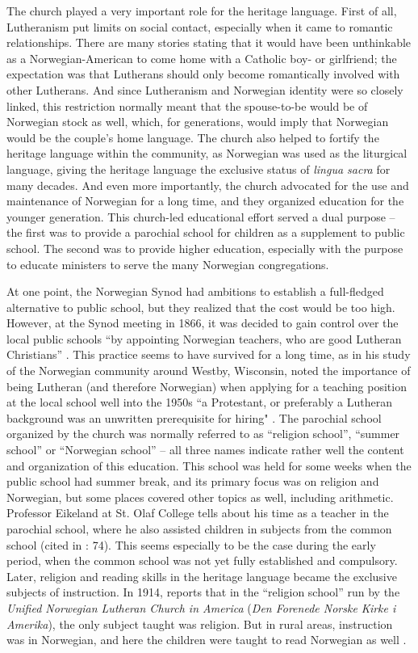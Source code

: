 \documentclass[output=paper]{langscibook}
\begin{document}
The church played a very important role for the heritage language. First of all, Lutheranism put limits on social contact, especially when it came to romantic relationships. There are many stories stating that it would have been unthinkable as a Norwegian\hyp American to come home with a Catholic boy- or girlfriend; the expectation was that Lutherans should only become romantically involved with other Lutherans. And since Lutheranism and Norwegian identity were so closely linked, this restriction normally meant that the spouse-to-be would be of Norwegian stock as well, which, for generations, would imply that Norwegian would be the couple’s home language. The church also helped to fortify the heritage language within the community, as Norwegian was used as the liturgical language, giving the heritage language the exclusive status of \textit{lingua sacra} for many decades. And even more importantly, the church advocated for the use and maintenance of Norwegian for a long time, and they organized education for the younger generation. This church-led educational effort served a dual purpose – the first was to provide a parochial school for children as a supplement to public school. The second was to provide higher education, especially with the purpose to educate ministers to serve the many Norwegian congregations. 

At one point, the Norwegian Synod had ambitions to establish a full-fledged alternative to public school, but they realized that the cost would be too high. However, at the Synod meeting in 1866, it was decided to gain control over the local public schools “by appointing Norwegian teachers, who are good Lutheran Christians” \citep[107]{Lovoll1984}. This practice seems to have survived for a long time, as \citet{Ibarra1976} in his study of the Norwegian community around Westby, Wisconsin, noted the importance of being Lutheran (and therefore Norwegian) when applying for a teaching position at the local school well into the 1950s ``a Protestant, or preferably a Lutheran background was an unwritten prerequisite for hiring" \citep[230]{Ibarra1976}. The parochial school organized by the church was normally referred to as “religion school”, “summer school” or “Norwegian school” – all three names indicate rather well the content and organization of this education. This school was held for some weeks when the public school had summer break, and its primary focus was on religion and Norwegian, but some places covered other topics as well, including arithmetic. Professor Eikeland at St. Olaf College tells about his time as a teacher in the parochial school, where he also assisted children in subjects from the common school (cited in \citealt{Hvenekilde1992}: 74). This seems especially to be the case during the early period, when the common school was not yet fully established and compulsory. Later, religion and reading skills in the heritage language became the exclusive subjects of instruction. In 1914, \citeauthor{Nordlie1914} reports that in the “religion school” run by the \textit{Unified Norwegian Lutheran Church in America} (\textit{Den Forenede Norske Kirke i Amerika}), the only subject taught was religion. But in rural areas, instruction was in Norwegian, and here the children were taught to read Norwegian as well \citep[64]{Nordlie1914}. 
\end{document}

